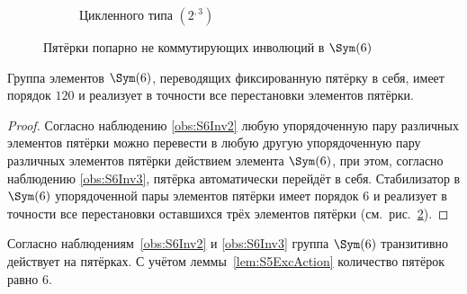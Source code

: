 \documentclass[
	extrafontsizes,
	11pt,
	hyphens,
]{memoir}
\begin{document}
\begin{figure}[h]
\begin{subfigure}[b]{0.4\textwidth}
    \caption{Цикленного типа \((2^{,3})\)}
    \label{fig:Inv2}
  \end{subfigure}
  \caption{Пятёрки попарно не коммутирующих инволюций в \(\Sym(6)\)}
\end{figure}

\begin{lemma} \label{lem:S5ExcAction}
Группа элементов \(\Sym(6)\), переводящих фиксированную пятёрку в себя, имеет порядок \(120\) и реализует в точности все перестановки элементов пятёрки.
\end{lemma}

\begin{proof}
Согласно наблюдению \ref{obs:S6Inv2} любую упорядоченную пару различных элементов пятёрки можно перевести в любую другую упорядоченную пару различных элементов пятёрки действием элемента \(\Sym(6)\),
при этом, согласно наблюдению \ref{obs:S6Inv3}, пятёрка автоматически перейдёт в себя.
Стабилизатор в \(\Sym(6)\) упорядоченной пары элементов пятёрки имеет порядок \(6\) и реализует в точности все перестановки оставшихся трёх элементов пятёрки (см.\ рис.\ \ref{fig:Inv2}).
\end{proof}

\begin{observation}
Согласно наблюдениям~\ref{obs:S6Inv2} и \ref{obs:S6Inv3} группа \(\Sym(6)\) транзитивно действует на пятёрках.
С учётом леммы~\ref{lem:S5ExcAction} количество пятёрок равно \(6\).
\end{observation}
\end{document}
